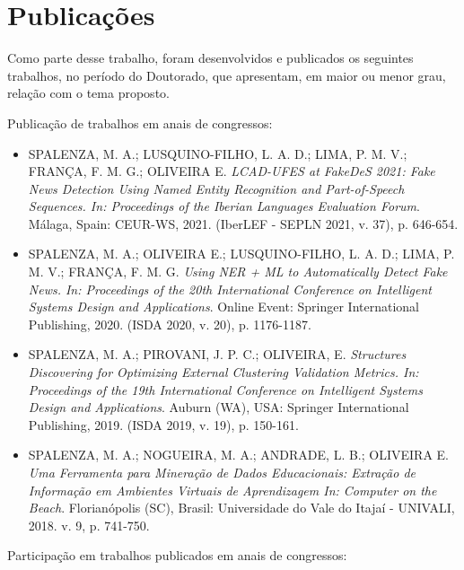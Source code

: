 \documentclass[
	12pt,				%
	openright,			%
	twoside,			%
	a4paper,			%
	english,			%
	french,				%
	spanish,			%
	brazil				%
	]{abntex2}
\begin{document}
\chapter*{Publicações}
Como parte desse trabalho, foram desenvolvidos e publicados os seguintes trabalhos,
no período do Doutorado, que apresentam, em maior ou menor grau, relação com o tema
proposto.

\noindent Publicação de trabalhos em anais de congressos:

\begin{itemize}[label={}]
\scriptsize
\item SPALENZA, M. A.; LUSQUINO-FILHO, L. A. D.; LIMA, P. M. V.; FRANÇA, F. M. G.; OLIVEIRA E. \textit{LCAD-UFES at FakeDeS 2021: Fake News Detection Using Named Entity Recognition and Part-of-Speech Sequences. In: Proceedings of the Iberian Languages Evaluation Forum}. M{\'a}laga, Spain: CEUR-WS, 2021. (IberLEF - SEPLN 2021, v. 37), p. 646-654.

\item SPALENZA, M. A.; OLIVEIRA E.; LUSQUINO-FILHO, L. A. D.; LIMA, P. M. V.; FRANÇA, F. M. G. \textit{Using NER + ML to Automatically Detect Fake News. In: Proceedings of the 20th International Conference on Intelligent Systems Design and Applications}. Online Event: Springer International Publishing, 2020. (ISDA 2020, v. 20), p. 1176-1187.

\item SPALENZA, M. A.; PIROVANI, J. P. C.; OLIVEIRA, E. \textit{Structures Discovering for Optimizing External Clustering Validation Metrics. In: Proceedings of the 19th International Conference on Intelligent Systems Design and Applications}. Auburn (WA), USA: Springer International Publishing, 2019. (ISDA 2019, v. 19), p. 150-161.

\item SPALENZA, M. A.; NOGUEIRA, M. A.; ANDRADE, L. B.; OLIVEIRA E. \textit{Uma Ferramenta para Minera{\c c}{\~a}o de Dados Educacionais: Extra{\c c}{\~a}o de Informa{\c c}{\~a}o em Ambientes Virtuais de Aprendizagem In: Computer on the Beach}. Florian{\'o}polis (SC), Brasil: Universidade do Vale do Itajaí - UNIVALI, 2018. v. 9, p. 741-750.

\end{itemize}

\noindent Participação em trabalhos publicados em anais de congressos:
\end{document}
